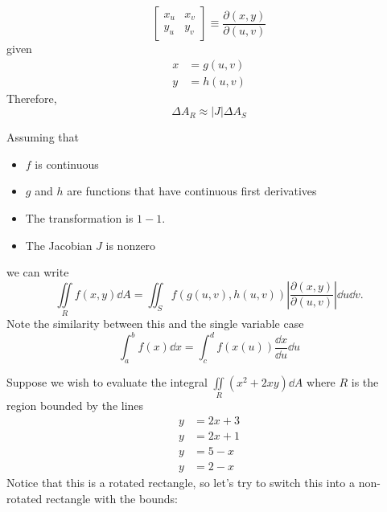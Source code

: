 \begin{itemize}
\begin{definition}
\begin{equation}
\begin{bmatrix}
                x_u & x_v \\ 
                y_u & y_v
            \end{bmatrix} \equiv \frac{\partial(x,y)}{\partial(u,v)}
        \end{equation}
        given 
        \begin{align}
            x &= g(u,v) \\ 
            y &= h(u,v)
        \end{align}
        Therefore, 
        \begin{equation}
            \Delta A_R \approx |J|\Delta A_S
        \end{equation}
    \end{definition}
    \begin{theorem}
        Assuming that 
        \begin{itemize}
            \item $f$ is continuous
            \item $g$ and $h$ are functions that have continuous first derivatives
            \item The transformation is $1-1$.
            \item The Jacobian $J$ is nonzero
        \end{itemize}
        we can write 
        \begin{equation}
            \iint\limits_R f(x,y)\dd{A} = \iint_S f(g(u,v),h(u,v))\left|\frac{\partial(x,y)}{\partial(u,v)}\right|\dd{u}\dd{v}.
        \end{equation}
        Note the similarity between this and the single variable case 
        \begin{equation}
            \int_a^b f(x) \dd{x} = \int_c^d f(x(u)) \frac{\dd{x}}{\dd{u}} \dd{u}
        \end{equation}
    \end{theorem}
    \begin{example}
        Suppose we wish to evaluate the integral $\iint\limits_R (x^2+2xy)\dd{A}$ where $R$ is the region bounded by the lines 
        \begin{align}
            y &= 2x+3 \\ 
            y &= 2x+1 \\ 
            y &= 5-x \\ 
            y &= 2-x
        \end{align}
        Notice that this is a rotated rectangle, so let's try to switch this into a non-rotated rectangle with the bounds: 

\end{example}
\end{itemize}
